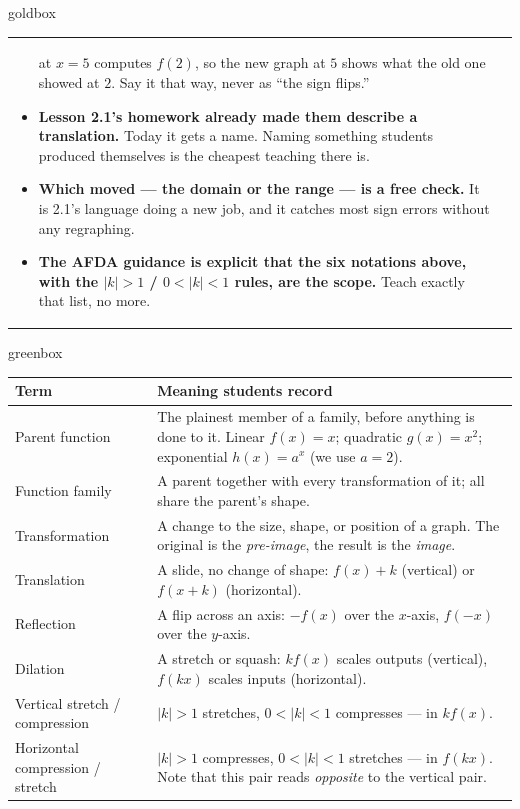 \documentclass[10pt]{article}
\begin{document}
\begin{skillbox}{goldbox}
\begin{tabularx}{\linewidth}{@{}X|X@{}}
\begin{minipage}[t]{\linewidth}
\begin{itemize}[leftmargin=1.1em, itemsep=2pt, topsep=2pt]
        at $x=5$ computes $f(2)$, so the new graph at $5$ shows what the old one showed at $2$.
        Say it that way, never as ``the sign flips.''
  \item \textbf{Lesson 2.1's homework already made them describe a translation.} Today it gets a
        name. Naming something students produced themselves is the cheapest teaching there is.
  \item \textbf{Which moved --- the domain or the range --- is a free check.} It is 2.1's language
        doing a new job, and it catches most sign errors without any regraphing.
  \item \textbf{The AFDA guidance is explicit that the six notations above, with the
        $|k|>1$ / $0<|k|<1$ rules, are the scope.} Teach exactly that list, no more.
\end{itemize}
\end{minipage}
\end{tabularx}
\end{skillbox}

\begin{skillbox}{greenbox}
\renewcommand{\arraystretch}{1.35}
\begin{tabularx}{\linewidth}{@{}p{3.6cm}X@{}}
\textbf{Term} & \textbf{Meaning students record} \\
\hline
Parent function & The plainest member of a family, before anything is done to it. Linear
    $f(x)=x$; quadratic $g(x)=x^2$; exponential $h(x)=a^x$ (we use $a=2$). \\
Function family & A parent together with every transformation of it; all share the parent's
    shape. \\
Transformation & A change to the size, shape, or position of a graph. The original is the
    \emph{pre-image}, the result is the \emph{image}. \\
Translation & A slide, no change of shape: $f(x)+k$ (vertical) or $f(x+k)$ (horizontal). \\
Reflection & A flip across an axis: $-f(x)$ over the $x$-axis, $f(-x)$ over the $y$-axis. \\
Dilation & A stretch or squash: $k f(x)$ scales outputs (vertical), $f(kx)$ scales inputs
    (horizontal). \\
Vertical stretch / compression & $|k|>1$ stretches, $0<|k|<1$ compresses --- in $k f(x)$. \\
Horizontal compression / stretch & $|k|>1$ compresses, $0<|k|<1$ stretches --- in $f(kx)$. Note
    that this pair reads \emph{opposite} to the vertical pair. \\
\end{tabularx}
\end{skillbox}
\end{document}
